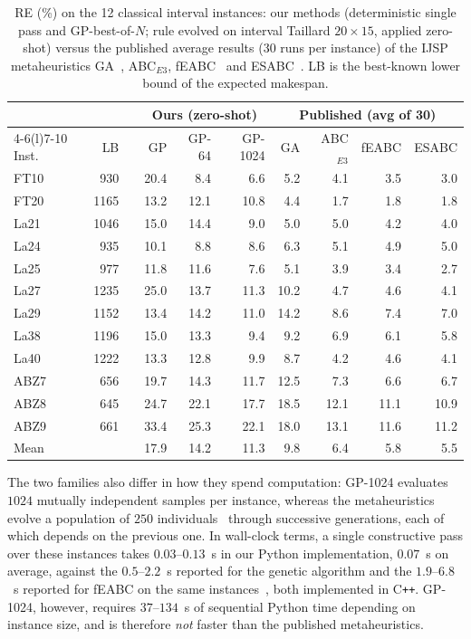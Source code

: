 \documentclass[review,authoryear,11pt]{elsarticle}
\begin{document}
\begin{table}[t]
\centering\small
\caption{RE (\%) on the 12 classical interval instances: our methods
(deterministic single pass and GP-best-of-$N$; rule evolved
on interval Taillard $20{\times}15$, applied zero-shot) versus the
published average results (30 runs per instance) of the IJSP
metaheuristics GA~\citep{DiazGA2020}, ABC$_{E3}$, fEABC~\citep{DiazFEABC2023}
and ESABC~\citep{DiazICAE2023}. LB is the best-known lower bound of the
expected makespan.}
\label{tab:classics}
\setlength{\tabcolsep}{4.5pt}
\begin{tabular}{lrrrrrrrrr}
\toprule
& & & \multicolumn{3}{c}{Ours (zero-shot)} &
\multicolumn{4}{c}{Published (avg of 30)} \\
\cmidrule(lr){4-6}\cmidrule(l){7-10}
Inst. & LB & & GP & GP-64 & GP-1024 &
GA & ABC$_{E3}$ & fEABC & ESABC \\
\midrule
FT10 & 930 & & 20.4 & 8.4 & 6.6 & 5.2 & 4.1 & 3.5 & 3.0 \\
FT20 & 1165 & & 13.2 & 12.1 & 10.8 & 4.4 & 1.7 & 1.8 & 1.8 \\
La21 & 1046 & & 15.0 & 14.4 & 9.0 & 5.0 & 5.0 & 4.2 & 4.0 \\
La24 & 935 & & 10.1 & 8.8 & 8.6 & 6.3 & 5.1 & 4.9 & 5.0 \\
La25 & 977 & & 11.8 & 11.6 & 7.6 & 5.1 & 3.9 & 3.4 & 2.7 \\
La27 & 1235 & & 25.0 & 13.7 & 11.3 & 10.2 & 4.7 & 4.6 & 4.1 \\
La29 & 1152 & & 13.4 & 14.2 & 11.0 & 14.2 & 8.6 & 7.4 & 7.0 \\
La38 & 1196 & & 15.0 & 13.3 & 9.4 & 9.2 & 6.9 & 6.1 & 5.8 \\
La40 & 1222 & & 13.3 & 12.8 & 9.9 & 8.7 & 4.2 & 4.6 & 4.1 \\
ABZ7 & 656 & & 19.7 & 14.3 & 11.7 & 12.5 & 7.3 & 6.6 & 6.7 \\
ABZ8 & 645 & & 24.7 & 22.1 & 17.7 & 18.5 & 12.1 & 11.1 & 10.9 \\
ABZ9 & 661 & & 33.4 & 25.3 & 22.1 & 18.0 & 13.1 & 11.6 & 11.2 \\
\midrule
Mean & & & 17.9 & 14.2 & 11.3 & 9.8 & 6.4 & 5.8 & 5.5 \\
\bottomrule
\end{tabular}
\end{table}

The two families also differ in how they spend computation:
GP-1024 evaluates $1024$ mutually independent samples per instance,
whereas the metaheuristics evolve a population of $250$
individuals~\citep{DiazGA2020,DiazFEABC2023} through successive
generations, each of which depends on the previous one. In wall-clock
terms, a single constructive pass over these instances takes
$0.03$--$0.13$~s in our Python implementation, $0.07$~s on average,
against the $0.5$--$2.2$~s reported for the genetic algorithm and the
$1.9$--$6.8$~s reported for fEABC on the same
instances~\citep{DiazFEABC2023}, both implemented in C\texttt{++}.
GP-1024, however, requires $37$--$134$~s of sequential Python time
depending on instance size, and is therefore \emph{not} faster than the
published metaheuristics.
\end{document}
